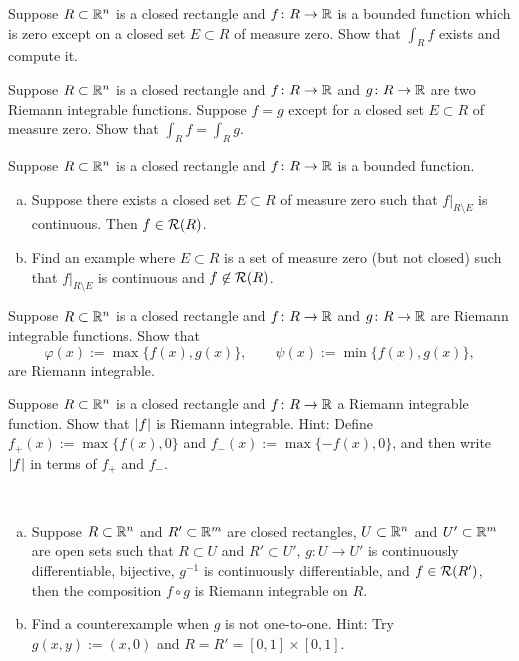 \begin{exercise}
Suppose $R \subset {\mathbb{R}}^n$ is a closed rectangle and
$f \colon R \to {\mathbb{R}}$ is a bounded function which is zero except on a closed set $E
\subset R$ of measure
zero.  Show that $\int_R f$ exists and compute it.
\end{exercise}

\begin{exercise}
Suppose $R \subset {\mathbb{R}}^n$ is a closed rectangle and
$f \colon R \to {\mathbb{R}}$ and
$g \colon R \to {\mathbb{R}}$ are two Riemann integrable functions.  Suppose $f = g$
except for a closed set $E \subset R$ of measure zero.  Show that $\int_R f = \int_R g$.
\end{exercise}

\begin{samepage}
\begin{exercise}
Suppose $R \subset {\mathbb{R}}^n$ is a closed rectangle and
$f \colon R \to {\mathbb{R}}$ is a bounded function.
\begin{enumerate}[a)]
\item
Suppose there exists a closed set $E \subset R$ of measure zero such that
$f|_{R\setminus E}$ is continuous.  Then $f \in {\mathcal{R}}(R)$.
\item
Find an example where $E \subset R$ is a set of measure zero (but not
closed) such that
$f|_{R\setminus E}$ is continuous and $f \not\in {\mathcal{R}}(R)$.
\end{enumerate}
\end{exercise}
\end{samepage}

\begin{exercise}
Suppose $R \subset {\mathbb{R}}^n$ is a closed rectangle
and $f \colon R \to {\mathbb{R}}$ and $g \colon R \to {\mathbb{R}}$ 
are Riemann integrable functions.
Show that
\begin{equation*}
\varphi(x) := \max \{ f(x) , g(x) \} ,
\qquad
\psi(x) := \min \{ f(x) , g(x) \} ,
\end{equation*}
are Riemann integrable.
\end{exercise}

\begin{exercise}
Suppose $R \subset {\mathbb{R}}^n$ is a closed rectangle
and $f \colon R \to {\mathbb{R}}$ a Riemann integrable function.
Show that $\lvert {f} \rvert$ is Riemann integrable.
Hint: Define
$f_+(x) := \max \{ f(x) , 0 \}$ and
$f_-(x) := \max \{ -f(x) , 0 \}$, and then write $\lvert {f} \rvert$
in terms of $f_+$ and $f_-$.
\end{exercise}

\begin{exercise}
{\ }
\begin{enumerate}[a)]
\item
Suppose $R \subset {\mathbb{R}}^n$ and
$R' \subset {\mathbb{R}}^m$ are closed rectangles,
$U \subset {\mathbb{R}}^n$ and $U' \subset {\mathbb{R}}^m$ are open sets such that
$R \subset U$ and $R' \subset U'$,
$g \colon U \to U'$ is continuously differentiable, bijective,
$g^{-1}$ is continuously differentiable, and
$f \in {\mathcal{R}}(R')$, 
then the composition $f \circ g$ is Riemann integrable on $R$.
\item
Find a counterexample when $g$ is not one-to-one.
Hint: Try $g(x,y) := (x,0)$ and $R=R'=[0,1] \times [0,1]$.
\end{enumerate}
\end{exercise}

